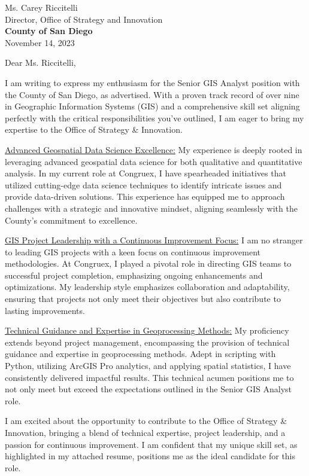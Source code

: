\documentclass[letterpaper]{article}
\newcommand{\impt}[1]{\uline{#1}}
\begin{document}
\large
Ms. Carey Riccitelli \\
Director, Office of Strategy and Innovation \\
\textbf{County of San Diego} \\

\null\hfill November 14, 2023


Dear Ms. Riccitelli,
 
I am writing to express my enthusiasm for the Senior GIS Analyst position with the County of San Diego, as advertised. 
With a proven track record of over nine in Geographic Information Systems (GIS) and a comprehensive skill set
aligning perfectly with the critical responsibilities you've outlined, I am eager to bring my expertise to the 
Office of Strategy \& Innovation.

\impt{Advanced Geospatial Data Science Excellence:}
My experience is deeply rooted in leveraging advanced geospatial data science for both qualitative and quantitative analysis. 
In my current role at Congruex, I have spearheaded initiatives that utilized cutting-edge data science techniques to 
identify intricate issues and provide data-driven solutions. 
This experience has equipped me to approach challenges with a strategic and innovative mindset, 
aligning seamlessly with the County's commitment to excellence.

\impt{GIS Project Leadership with a Continuous Improvement Focus:}
I am no stranger to leading GIS projects with a keen focus on continuous improvement methodologies. 
At Congruex, I played a pivotal role in directing GIS teams to successful project completion, 
emphasizing ongoing enhancements and optimizations. 
My leadership style emphasizes collaboration and adaptability, ensuring that projects 
not only meet their objectives but also contribute to lasting improvements.

\impt{Technical Guidance and Expertise in Geoprocessing Methods:}
My proficiency extends beyond project management, encompassing the provision of technical guidance and 
expertise in geoprocessing methods. 
Adept in scripting with Python, utilizing ArcGIS Pro analytics, and applying spatial statistics, 
I have consistently delivered impactful results. 
This technical acumen positions me to not only meet but exceed the expectations outlined in the Senior GIS Analyst role.

I am excited about the opportunity to contribute to the Office of Strategy \& Innovation, 
bringing a blend of technical expertise, project leadership, and a passion for continuous improvement. 
I am confident that my unique skill set, as highlighted in my attached resume, 
positions me as the ideal candidate for this role.
\end{document}
